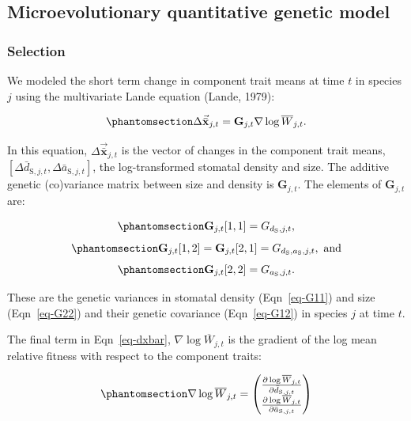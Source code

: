 \documentclass[
  letterpaper,
  DIV=11,
  numbers=noendperiod]{scrartcl}
\begin{document}
\subsection{Microevolutionary quantitative genetic
model}\label{microevolutionary-quantitative-genetic-model}

\subsubsection{Selection}\label{selection}

We modeled the short term change in component trait means at time \(t\)
in species \(j\) using the multivariate Lande equation (Lande, 1979):

\begin{equation}\phantomsection\label{eq-dxbar}{\Delta \vec{\bar{\mathbf{x}}}_{j,t} = \mathbf{G}_{j,t} \nabla \log \overline{W}_{j,t}.}\end{equation}

In this equation, \(\Delta \vec{\bar{\mathbf{x}}}_{j,t}\) is the vector
of changes in the component trait means,
\(\left[\Delta \bar{d}_{\mathrm{S},j,t}, \Delta \bar{a}_{\mathrm{S},j,t}\right]\),
the log-transformed stomatal density and size. The additive genetic
(co)variance matrix between size and density is \(\mathbf{G}_{j,t}\).
The elements of \(\mathbf{G}_{j,t}\) are:

\begin{equation}\phantomsection\label{eq-G11}{\mathbf{G}_{j,t}[1,1] = G_{d_\mathrm{S},j,t},}\end{equation}
\begin{equation}\phantomsection\label{eq-G12}{\mathbf{G}_{j,t}[1,2] = \mathbf{G}_{j,t}[2,1] = G_{d_\mathrm{S},a_\mathrm{S},j,t},~\text{and}}\end{equation}
\begin{equation}\phantomsection\label{eq-G22}{\mathbf{G}_{j,t}[2,2] = G_{a_\mathrm{S},j,t}.}\end{equation}

These are the genetic variances in stomatal density (Eqn~\ref{eq-G11})
and size (Eqn~\ref{eq-G22}) and their genetic covariance
(Eqn~\ref{eq-G12}) in species \(j\) at time \(t\).

The final term in Eqn~\ref{eq-dxbar}, \(\nabla \log \overline{W}_{j,t}\)
is the gradient of the log mean relative fitness with respect to the
component traits:

\begin{equation}\phantomsection\label{eq-dellogW}{\nabla \log \overline{W}_{j,t} = \begin{pmatrix} \frac{\partial \log \overline{W}_{j,t}}{\partial \bar{d}_{\mathrm{S},j,t}} \\ \frac{\partial \log \overline{W}_{j,t}}{\partial \bar{a}_{\mathrm{S},j,t}} \end{pmatrix}}\end{equation}
\end{document}
